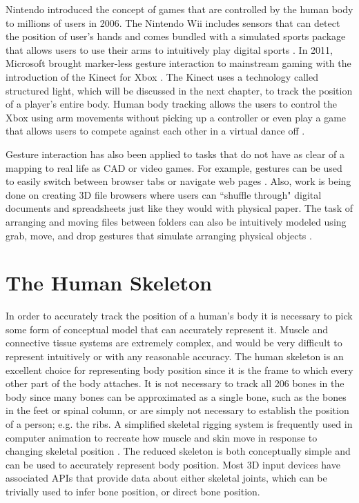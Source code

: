 Nintendo introduced the concept of games that are controlled by the human body to millions of users in 2006. The Nintendo Wii includes sensors that can detect the position of user's hands and comes bundled with a simulated sports package that allows users to use their arms to intuitively play digital sports \cite{pasch2009movement}. In 2011, Microsoft brought marker-less gesture interaction to mainstream gaming with the introduction of the Kinect for Xbox \cite{kinectlaunch}. The Kinect uses a technology called structured light, which will be discussed in the next chapter, to track the position of a player's entire body. Human body tracking allows the users to control the Xbox using arm movements without picking up a controller or even play a game that allows users to compete against each other in a virtual dance off \cite{zhang2012microsoft}.

Gesture interaction has also been applied to tasks that do not have as clear of a mapping to real life as CAD or video games. For example, gestures can be used to easily switch between browser tabs or navigate web pages \cite{moyle2003design}. Also, work is being done on creating 3D file browsers where users can ``shuffle through" digital documents and spreadsheets just like they would with physical paper. The task of arranging and moving files between folders can also be intuitively modeled using grab, move, and drop gestures that simulate arranging physical objects \cite{dnd_interface}.

\section{The Human Skeleton}

In order to accurately track the position of a human's body it is necessary to pick some form of conceptual model that can accurately represent it. Muscle and connective tissue systems are extremely complex, and would be very difficult to represent intuitively or with any reasonable accuracy. The human skeleton is an excellent choice for representing body position since it is the frame to which every other part of the body attaches. It is not necessary to track all 206 bones in the body since many bones can be approximated as a single bone, such as the bones in the feet or spinal column, or are simply not necessary to establish the position of a person; e.g. the ribs. A simplified skeletal rigging system is frequently used in computer animation to recreate how muscle and skin move in response to changing skeletal position \cite{parent2012computer}. The reduced skeleton is both conceptually simple and can be used to accurately represent body position. Most 3D input devices have associated APIs that provide data about either skeletal joints, which can be trivially used to infer bone position, or direct bone position.

